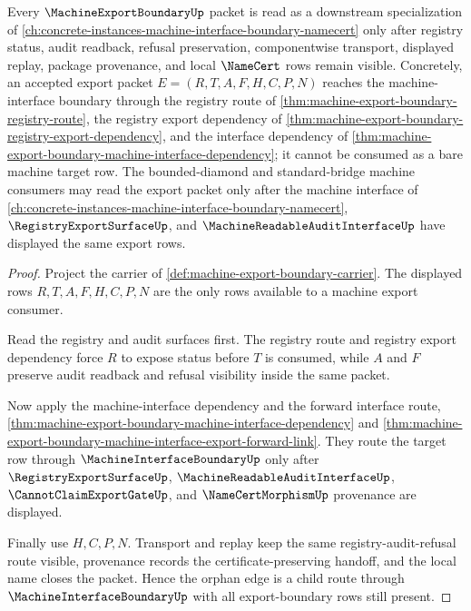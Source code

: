 \begin{theorem}
\label{thm:machine-export-boundary-orphan-interface-route}
Every $\MachineExportBoundaryUp$ packet is read as a downstream specialization of \autoref{ch:concrete-instances-machine-interface-boundary-namecert} only after registry status, audit readback, refusal preservation, componentwise transport, displayed replay, package provenance, and local $\NameCert$ rows remain visible. Concretely, an accepted export packet $E=(R,T,A,F,H,C,P,N)$ reaches the machine-interface boundary through the registry route of \autoref{thm:machine-export-boundary-registry-route}, the registry export dependency of \autoref{thm:machine-export-boundary-registry-export-dependency}, and the interface dependency of \autoref{thm:machine-export-boundary-machine-interface-dependency}; it cannot be consumed as a bare machine target row. The bounded-diamond and standard-bridge machine consumers may read the export packet only after the machine interface of \autoref{ch:concrete-instances-machine-interface-boundary-namecert}, $\RegistryExportSurfaceUp$, and $\MachineReadableAuditInterfaceUp$ have displayed the same export rows.
\end{theorem}
\begin{proof}
Project the carrier of \autoref{def:machine-export-boundary-carrier}. The displayed rows $R,T,A,F,H,C,P,N$ are the only rows available to a machine export consumer.

Read the registry and audit surfaces first. The registry route and registry export dependency force $R$ to expose status before $T$ is consumed, while $A$ and $F$ preserve audit readback and refusal visibility inside the same packet.

Now apply the machine-interface dependency and the forward interface route, \autoref{thm:machine-export-boundary-machine-interface-dependency} and \autoref{thm:machine-export-boundary-machine-interface-export-forward-link}. They route the target row through $\MachineInterfaceBoundaryUp$ only after $\RegistryExportSurfaceUp$, $\MachineReadableAuditInterfaceUp$, $\CannotClaimExportGateUp$, and $\NameCertMorphismUp$ provenance are displayed.

Finally use $H,C,P,N$. Transport and replay keep the same registry-audit-refusal route visible, provenance records the certificate-preserving handoff, and the local name closes the packet. Hence the orphan edge is a child route through $\MachineInterfaceBoundaryUp$ with all export-boundary rows still present.
\end{proof}

